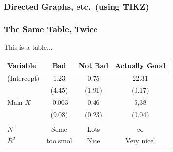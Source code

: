 \documentclass[10pt]{beamer}
\newcommand{\+}{\item}
\newcommand{\?}{\item[$\cdot$]}
\newcommand{\0}{\mathbf{0}}
\newcommand{\1}{\mathbf{1}}
\begin{document}
\begin{frame}[fragile] \frametitle{Directed Graphs, etc.\ (using TIKZ)}


\begin{center}
\end{center}

\end{frame}


\begin{frame}[fragile,shrink=10] \frametitle{The Same Table, Twice}



\begin{center}
This is a table... \\
\smallskip
\begin{tabular}{lccc}
\hline \hline
Variable & Bad & Not Bad & Actually Good \\
\hline
(Intercept) &   1.23   &   0.75    &   22.31   \\
                  & (4.45)  & (1.91)    &  (0.17) \\
Main $X$   &  -0.003 &  0.46    &  5,38    \\
                  & (9.08)  & (0.23)    &  (0.04) \\
                 &            &              &                \\
$N$          & Some  &  Lots     &   $\infty$  \\
$R^{2}$    & too smol & Nice & Very nice! \\
\hline \hline
\end{tabular}
\end{center}

\bigskip



\end{frame}
\end{document}
